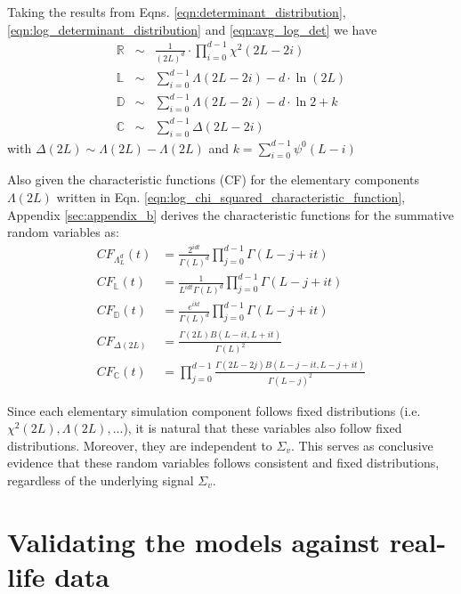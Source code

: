 \documentclass[journal]{IEEEtran}
\begin{document}
Taking the results from Eqns. \ref{eqn:determinant_distribution}, \ref{eqn:log_determinant_distribution} and \ref{eqn:avg_log_det} we have
\begin{eqnarray}
\mathbb{R} &\sim& \frac{1}{(2L)^d} \cdot \prod_{i=0}^{d-1} \chi^2 (2L-2i) \label{eqn:determinant_ratio_distribution} \\
\mathbb{L} &\sim&  \sum^{d-1}_{i=0} \Lambda(2L-2i) - d \cdot \ln(2L)
\label{eqn:log_determinant_distance_distribution} \\ 
 \mathbb{D} &\sim& \sum^{d-1}_{i=0} \Lambda(2L-2i) - d \cdot \ln{2} + k
\label{eqn:dispersion_distribution} \\ 
 \mathbb{C} &\sim& \sum^{d-1}_{i=0} \Delta(2L-2i)
\label{eqn:contrast_distribution}  
\end{eqnarray}
with $\Delta(2L) \sim \Lambda(2L) - \Lambda(2L)$
and $k=\sum^{d-1}_{i=0} \psi^0(L-i)$

Also given the characteristic functions (CF) for the elementary components $\Lambda(2L)$ written in Eqn. \ref{eqn:log_chi_squared_characteristic_function}, 
  Appendix \ref{sec:appendix_b} derives the characteristic functions for the summative random variables as:
\begin{align}
  CF_{\Lambda^d_L}(t) &= \frac{2^{idt}}{\Gamma(L)^d} \prod^{d-1}_{j=0} \Gamma(L-j+it) \\
  CF_{\mathbb{L}}(t) &= \frac{1}{L^{idt} \Gamma(L)^d} \prod^{d-1}_{j=0} \Gamma(L-j+it) \\
  CF_{\mathbb{D}}(t) &= \frac{e^{ikt}}{\Gamma(L)^d} \prod^{d-1}_{j=0} \Gamma(L-j+it) \\
  CF_{\Delta(2L)} &= \frac{\Gamma(2L) B(L-it,L+it)}{\Gamma(L)^2} \\
  CF_{\mathbb{C}}(t) &=  \prod^{d-1}_{j=0} \frac{\Gamma(2L-2j) B(L-j-it,L-j+it)}{\Gamma(L-j)^2}
\end{align}

Since each elementary simulation component follows fixed distributions (i.e. $\chi^2(2L), \Lambda(2L), ... $),
  it is natural that these variables also follow fixed distributions.
Moreover, they are independent to $\Sigma_v$.
This serves as conclusive evidence that
  these random variables follows consistent and fixed distributions,
  regardless of the underlying signal $\Sigma_v$.

\section{Validating the models against real-life data}
\label{sec:polsar_models_validation}
\end{document}
